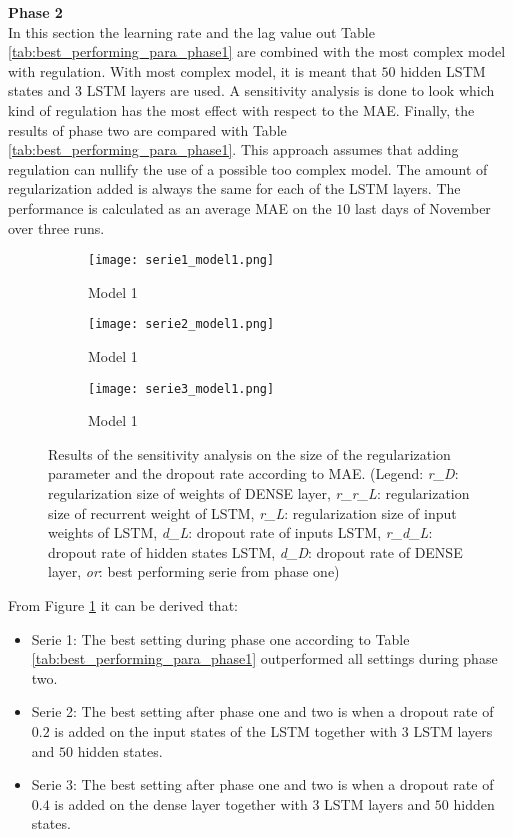 \textbf{Phase 2}\\
In this section the learning rate and the lag value out Table \ref{tab:best_performing_para_phase1} are combined with the most complex model with regulation. With most complex model, it is meant that $ 50 $ hidden LSTM states and $ 3 $ LSTM layers are used. A sensitivity analysis is done to look which kind of regulation has the most effect with respect to the MAE. Finally, the results of phase two are compared with Table \ref{tab:best_performing_para_phase1}. This approach assumes that adding regulation can nullify the use of a possible too complex model. The amount of regularization added is always the same for each of the LSTM layers. The performance is calculated as an average MAE on the $ 10 $ last days of November over three runs.\\

\begin{figure}[h!]
	\centering
	\begin{subfigure}{0.49\linewidth}
		\texttt{[image: serie1\_model1.png]}
		\caption{Model 1}
	\end{subfigure}	
	\begin{subfigure}{0.49\linewidth}
		\texttt{[image: serie2\_model1.png]}
		\caption{Model 1}
	\end{subfigure}
\begin{subfigure}{0.5\linewidth}
	\texttt{[image: serie3\_model1.png]}
	\caption{Model 1}
\end{subfigure}
	\caption{Results of the sensitivity analysis on the size of the regularization parameter and the dropout rate according to MAE. (Legend: \textit{r\_D}: regularization size of weights of DENSE layer,  \textit{r\_r\_L}: regularization size of recurrent weight of LSTM, \textit{r\_L}: regularization size of input weights of LSTM, \textit{d\_L}: dropout rate of inputs LSTM, \textit{r\_d\_L}: dropout rate of hidden states LSTM, \textit{d\_D}: dropout rate of DENSE layer, \textit{or}: best performing serie from phase one)}
	\label{fig:sensitivity_model1}
\end{figure}

From Figure \ref{fig:sensitivity_model1} it can be derived that:
\begin{itemize}
	\item Serie 1: The best setting during phase one according to Table \ref{tab:best_performing_para_phase1} outperformed all settings during phase two. 
	\item Serie 2: The best setting after phase one and two is when a dropout rate of $ 0.2 $ is added on the input states of the LSTM together with $ 3 $ LSTM layers and $ 50 $ hidden states.
	\item Serie 3: The best setting after phase one and two is when a dropout rate of $ 0.4 $ is added on the dense layer together with $ 3 $ LSTM layers and $ 50 $ hidden states.
\end{itemize}


